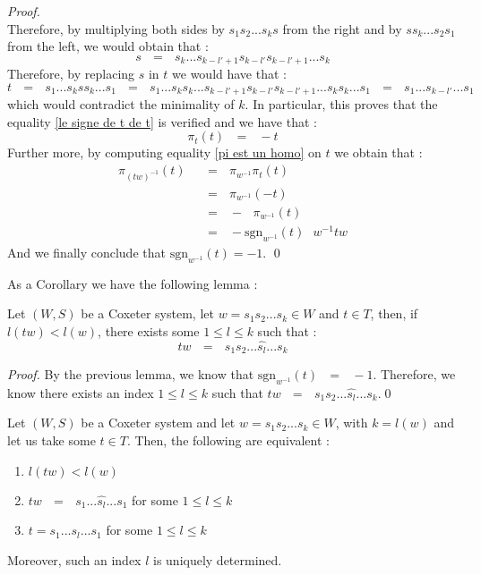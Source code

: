 \documentclass[envcountsame,envcountchap]{svmono}
\newcommand{\qq}{\text{ }}
\begin{document}
\begin{proof}
\begin{equation}
	\end{equation} 
	Therefore, by multiplying both sides by $s_1s_2...s_ks$ from the right and by $ss_k...s_2s_1$ from the left, we would obtain that :
	\begin{equation}
	s\qq=\qq s_k...s_{k-l'+1}s_{k-l'}s_{k-l'+1}...s_k
	\end{equation}
	Therefore, by replacing $s$ in $t$ we would have that :
	\begin{equation}
	t\qq=\qq s_1...s_kss_k...s_1\qq=\qq s_1...s_ks_k...s_{k-l'+1}s_{k-l'}s_{k-l'+1}...s_ks_k...s_1\qq=\qq s_1...s_{k-l'}...s_1
	\end{equation}
	which would contradict the minimality of $k$. In particular, this proves that the equality \eqref{le signe de t de t} is verified and we have that :
	\begin{equation}
	\pi_t(t)\qq=\qq -t
	\end{equation}
	Further more, by computing equality \eqref{pi est un homo} on $t$ we obtain that :
	\begin{equation}
	\begin{split}
	\pi_{(tw)^{-1}}(t)\qq&=\qq \pi_{w^{-1}}\pi_t(t)\qq\\
	&=\qq \pi_{w^{-1}}(-t)\qq\\
	&=\qq -\qq \pi_{w^{-1}}(t)\\
	&=\qq -\mbox{sgn}_{w^{-1}}(t)\qq w^{-1}tw
	\end{split}
	\end{equation}
	And we finally conclude that $\mbox{sgn}_{w^{-1}}(t)=-1$. \qed
	
\end{proof}
As a Corollary we have the following lemma :
\begin{lemma}
	Let $(W,S)$ be a Coxeter system, let $w=s_1s_2...s_k\in W$ and $t\in T$, then, if $l(tw)<l(w)$, there exists some $1\leq l\leq k$ such that :
	\begin{equation}
	tw\qq=\qq s_1s_2...\hat{s_l}... s_k
	\end{equation}
\end{lemma}
\begin{proof}
	By the previous lemma, we know that $\mbox{sgn}_{w^{-1}}(t)\qq=\qq -1$. Therefore, we know there exists an index $1\leq l\leq k$ such that $tw\qq=\qq s_1s_2...\hat{s_l}... s_k$.\qed 
\end{proof}
\begin{lemma}\label{les equivalences pour tw}
	Let $(W,S)$ be a Coxeter system and let $w=s_1s_2...s_k\in W$, with $k=l(w)$ and let us take some $t\in T$. Then, the following are equivalent :
	\begin{enumerate}
		\item $l(tw)<l(w)$
		\item $tw\qq=\qq s_1...\hat{s_l}...s_1$ for some $1\leq l\leq k$
		\item $t=s_1...s_l...s_1$ for some $1\leq l\leq k$
	\end{enumerate}
Moreover, such an index $l$ is uniquely determined.
\end{lemma}
\end{document}
